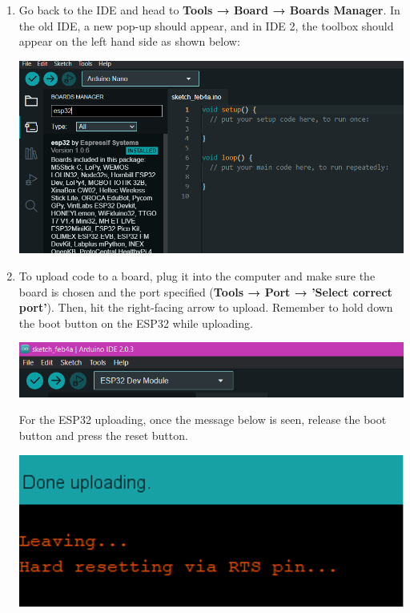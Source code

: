 \documentclass[a4paper,12pt]{report}
\newcommand{\imageWidth}{140mm}
\begin{document}
\begin{enumerate}
        \newpage
        \item Go back to the IDE and head to \textbf{Tools → Board → Boards Manager}. In the old IDE, a new pop-up should appear, and in IDE 2, the toolbox should appear on the left hand side as shown below:
        
        \begin{center}
            \includegraphics[width = \imageWidth]{Assets/Boards_manager.png}
        \end{center}
    
        \item To upload code to a board, plug it into the computer and make sure the board is chosen and the port specified (\textbf{Tools → Port → 'Select correct port'}). 
        Then, hit the right-facing arrow to upload. Remember to hold down the boot button on the ESP32 while uploading.
        \begin{center}
            \includegraphics[width = \imageWidth]{Assets/Upload.png}
        \end{center}
        For the ESP32 uploading, once the message below is seen, release the boot button and press the reset button.
        \begin{center}
            \includegraphics[scale = 0.7]{Assets/Hard_reset.png}
        \end{center}
    \end{enumerate}
\end{document}
